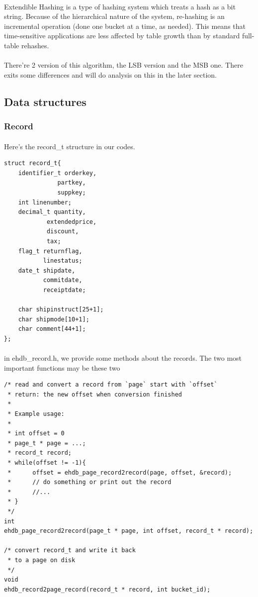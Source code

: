 \documentclass[a4paper, 12pt]{article}
\begin{document}
\begin{enumerate}
                \paragraph{}
                    Extendible Hashing is a type of hashing system which treats a hash as a bit string. Because of the hierarchical nature of the system, re-hashing is an incremental operation (done one bucket at a time, as needed). This means that time-sensitive applications are less affected by table growth than by standard full-table rehashes.
                \paragraph{}
                    There're 2 version of this algorithm, the LSB version and the MSB one. There exits some differences and will do analysis on this in the later section.
        \end{enumerate}
    \subsection{Data structures}
        \subsubsection{Record}
            \paragraph{}
                Here's the record\_t structure in our codes.
\begin{verbatim}
struct record_t{
    identifier_t orderkey, 
               partkey, 
               suppkey;
    int linenumber;
    decimal_t quantity,
            extendedprice,
            discount,
            tax;
    flag_t returnflag,
           linestatus;
    date_t shipdate,
           commitdate,
           receiptdate;

    char shipinstruct[25+1];
    char shipmode[10+1];
    char comment[44+1];
};
\end{verbatim}
            \paragraph{}
                in ehdb\_record.h, we provide some methods about the records. The two most important functions may be these two
\begin{verbatim}
/* read and convert a record from `page` start with `offset`
 * return: the new offset when conversion finished
 *
 * Example usage:
 *
 * int offset = 0
 * page_t * page = ...;
 * record_t record;
 * while(offset != -1){
 *      offset = ehdb_page_record2record(page, offset, &record);
 *      // do something or print out the record
 *      //...
 * }
 */
int 
ehdb_page_record2record(page_t * page, int offset, record_t * record);

/* convert record_t and write it back
 * to a page on disk
 */
void 
ehdb_record2page_record(record_t * record, int bucket_id);
\end{verbatim}
\end{document}
